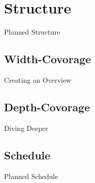 \documentclass[ucs,10pt]{beamer}
\begin{document}
\section{Structure}

\begin{frame}{Planned Structure}

\end{frame}

\subsection{Width-Covorage}
\begin{frame}{Creating an Overview}

\end{frame}

\subsection{Depth-Covorage}
\begin{frame}{Diving Deeper}

\end{frame}

\subsection{Schedule}
\begin{frame}{Planned Schedule}

\end{frame}
\end{document}
